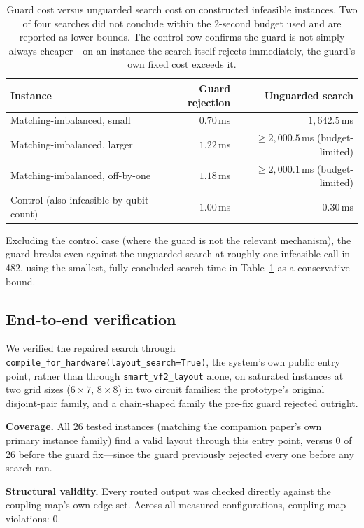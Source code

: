 \documentclass[11pt]{article}
\begin{document}
\begin{table}[h]
\centering
\begin{tabular}{lrr}
\toprule
Instance & Guard rejection & Unguarded search \\
\midrule
Matching-imbalanced, small & $0.70$\,ms & $1{,}642.5$\,ms \\
Matching-imbalanced, larger & $1.22$\,ms & $\geq 2{,}000.5$\,ms (budget-limited) \\
Matching-imbalanced, off-by-one & $1.18$\,ms & $\geq 2{,}000.1$\,ms (budget-limited) \\
Control (also infeasible by qubit count) & $1.00$\,ms & $0.30$\,ms \\
\bottomrule
\end{tabular}
\caption{Guard cost versus unguarded search cost on constructed
infeasible instances. Two of four searches did not conclude within the
$2$-second budget used and are reported as lower bounds. The control
row confirms the guard is not simply always cheaper---on an instance
the search itself rejects immediately, the guard's own fixed cost
exceeds it.}
\label{tab:guard}
\end{table}

Excluding the control case (where the guard is not the relevant
mechanism), the guard breaks even against the unguarded search at
roughly one infeasible call in 482, using the smallest, fully-concluded
search time in Table~\ref{tab:guard} as a conservative bound.

\subsection{End-to-end verification}
\label{sec:e2e}

We verified the repaired search through
\texttt{compile\_for\_hardware(layout\_search=True)}, the system's own
public entry point, rather than through \texttt{smart\_vf2\_layout}
alone, on saturated instances at two grid sizes ($6\times7$, $8\times8$)
in two circuit families: the prototype's original disjoint-pair family,
and a chain-shaped family the pre-fix guard rejected outright.

\textbf{Coverage.} All 26 tested instances (matching the companion
paper's own primary instance family) find a valid layout through this
entry point, versus 0 of 26 before the guard fix---since the guard
previously rejected every one before any search ran.

\textbf{Structural validity.} Every routed output was checked directly
against the coupling map's own edge set. Across all measured
configurations, coupling-map violations: $0$.
\end{document}
